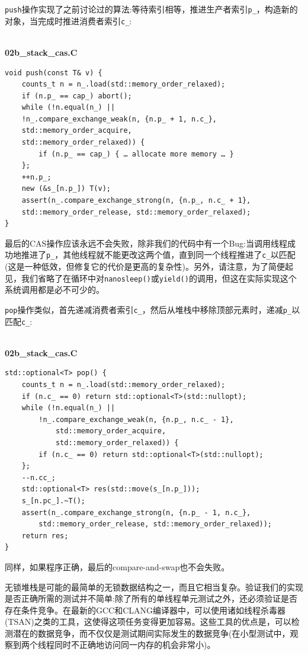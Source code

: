 \texttt{push}操作实现了之前讨论过的算法:等待索引相等，推进生产者索引\texttt{p\_}，构造新的对象，当完成时推进消费者索引\texttt{c\_}:

\hspace*{\fill} \\ %
\noindent
\textbf{02b\_stack\_cas.C}
\begin{lstlisting}[style=styleCXX]
void push(const T& v) {
	counts_t n = n_.load(std::memory_order_relaxed);
	if (n.p_ == cap_) abort();
	while (!n.equal(n_) ||
	!n_.compare_exchange_weak(n, {n.p_ + 1, n.c_},
	std::memory_order_acquire,
	std::memory_order_relaxed)) {
		if (n.p_ == cap_) { … allocate more memory … }
	};
	++n.p_;
	new (&s_[n.p_]) T(v);
	assert(n_.compare_exchange_strong(n, {n.p_, n.c_ + 1},
	std::memory_order_release, std::memory_order_relaxed);
}
\end{lstlisting}

最后的CAS操作应该永远不会失败，除非我们的代码中有一个Bug:当调用线程成功地推进了\texttt{p\_}，其他线程就不能更改这两个值，直到同一个线程推进了\texttt{c\_}以匹配(这是一种低效，但修复它的代价是更高的复杂性)。另外，请注意，为了简便起见，我们省略了在循环中对\texttt{nanosleep()}或\texttt{yield()}的调用，但这在实际实现这个系统调用都是必不可少的。

\texttt{pop}操作类似，首先递减消费者索引\texttt{c\_}，然后从堆栈中移除顶部元素时，递减\texttt{p\_}以匹配\texttt{c\_}:

\hspace*{\fill} \\ %
\noindent
\textbf{02b\_stack\_cas.C}
\begin{lstlisting}[style=styleCXX]
std::optional<T> pop() {
	counts_t n = n_.load(std::memory_order_relaxed);
	if (n.c_ == 0) return std::optional<T>(std::nullopt);
	while (!n.equal(n_) ||
		!n_.compare_exchange_weak(n, {n.p_, n.c_ - 1},
			std::memory_order_acquire,
			std::memory_order_relaxed)) {
		if (n.c_ == 0) return std::optional<T>(std::nullopt);
	};
	--n.cc_;
	std::optional<T> res(std::move(s_[n.p_]));
	s_[n.pc_].~T();
	assert(n_.compare_exchange_strong(n, {n.p_ - 1, n.c_},
		std::memory_order_release, std::memory_order_relaxed));
	return res;
}
\end{lstlisting}

同样，如果程序正确，最后的compare-and-swap也不会失败。

无锁堆栈是可能的最简单的无锁数据结构之一，而且它相当复杂。验证我们的实现是否正确所需的测试并不简单:除了所有的单线程单元测试之外，还必须验证是否存在条件竞争。在最新的GCC和CLANG编译器中，可以使用诸如线程杀毒器(TSAN)之类的工具，这使得这项任务变得更加容易。这些工具的优点是，可以检测潜在的数据竞争，而不仅仅是测试期间实际发生的数据竞争(在小型测试中，观察到两个线程同时不正确地访问同一内存的机会非常小)。


